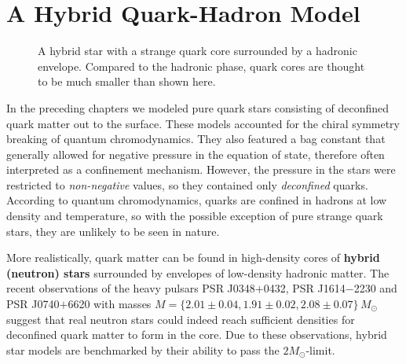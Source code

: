 \chapter{A Hybrid Quark-Hadron Model}
\label{chap:hybrid}

\begin{figure}[th!]
\centering
{}
\caption{\label{fig:hybrid:illustration}%
	A hybrid star with a strange quark core surrounded by a hadronic envelope.
	Compared to the hadronic phase,
	quark cores are thought to be much smaller than shown here.
}
\end{figure}

In the preceding chapters we modeled pure quark stars
consisting of deconfined quark matter out to the surface.
These models accounted for the chiral symmetry breaking of quantum chromodynamics.
They also featured a bag constant
that generally allowed for negative pressure in the equation of state,
therefore often interpreted as a confinement mechanism.
However, the pressure in the stars were restricted to \emph{non-negative} values,
so they contained only \emph{deconfined} quarks.
According to quantum chromodynamics,
quarks are confined in hadrons at low density and temperature,
so with the possible exception of pure strange quark stars,
they are unlikely to be seen in nature.

\iffalse
To calculate the lower bag constant bound \eqref{eq:lsm:bag_lower_bound},
we even assumed that two-flavor quark matter is unstable compared to hadronic matter at zero pressure.
But the surface has zero pressure \emph{by definition},
so it is inconsistent that two-flavor quark matter exists there!
\fi

More realistically,
quark matter can be found in high-density cores of \textbf{hybrid (neutron) stars}
surrounded by envelopes of low-density hadronic matter.
The recent observations \cite{ref:antoniadis,ref:arzoumanian,ref:fonseca}
of the heavy pulsars PSR J0348$+$0432, PSR J1614$-$2230 and PSR J0740$+$6620
with masses $M = \{2.01 \pm 0.04, 1.91 \pm 0.02, 2.08 \pm 0.07\} \, M_\odot$ 
suggest that real neutron stars could indeed reach sufficient densities
for deconfined quark matter to form in the core.
Due to these observations, hybrid star models are benchmarked by their ability to pass the $2 M_\odot$-limit.

